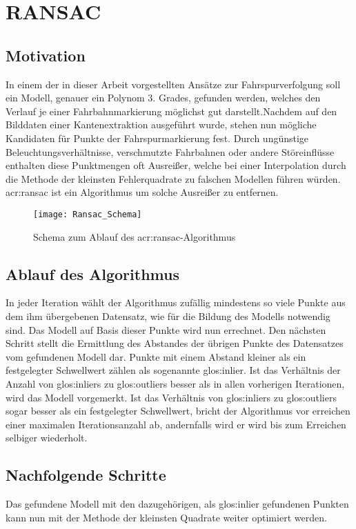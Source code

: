 \section{RANSAC}
\subsection{Motivation}
In einem der in dieser Arbeit vorgestellten Ansätze zur Fahrspurverfolgung soll ein Modell, genauer ein Polynom 3. Grades, gefunden werden, welches den Verlauf je einer Fahrbahnmarkierung möglichst gut darstellt.Nachdem auf den Bilddaten einer Kantenextraktion ausgeführt wurde, stehen nun mögliche Kandidaten für Punkte der Fahrspurmarkierung fest. Durch ungünstige Beleuchtungsverhältnisse, verschmutzte Fahrbahnen oder andere Störeinflüsse enthalten diese Punktmengen oft Ausreißer, welche bei einer Interpolation durch die Methode der kleinsten Fehlerquadrate zu falschen Modellen führen würden. \gls{acr:ransac} \autocite{fischler1981random} ist ein Algorithmus um solche Ausreißer zu entfernen.

\begin{figure}[H]
  \centering
  \texttt{[image: Ransac\_Schema]}
  \caption{Schema zum Ablauf des \gls{acr:ransac}-Algorithmus}
  \label{fig:ransac_scheme}
\end{figure}

\subsection{Ablauf des Algorithmus}
In jeder Iteration wählt der Algorithmus zufällig mindestens so viele Punkte aus dem ihm übergebenen Datensatz, wie für die Bildung des Modells notwendig sind. Das Modell auf Basis dieser Punkte wird nun errechnet. Den nächsten Schritt stellt die Ermittlung des Abstandes der übrigen Punkte des Datensatzes vom gefundenen Modell dar. Punkte mit einem Abstand kleiner als ein festgelegter Schwellwert zählen als sogenannte \gls{glos:inlier}. Ist das Verhältnis der Anzahl von \glspl{glos:inlier} zu \glspl{glos:outlier} besser als in allen vorherigen Iterationen, wird das Modell vorgemerkt. Ist das Verhältnis von \glspl{glos:inlier} zu \glspl{glos:outlier} sogar besser als ein festgelegter Schwellwert, bricht der Algorithmus vor erreichen einer maximalen Iterationsanzahl ab, andernfalls wird er wird bis zum Erreichen selbiger wiederholt.

\subsection{Nachfolgende Schritte}
Das gefundene Modell mit den dazugehörigen, als \gls{glos:inlier} gefundenen Punkten kann nun mit der Methode der kleinsten Quadrate weiter optimiert werden.




